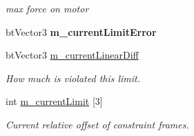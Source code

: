 \begin{DoxyCompactItemize}
\begin{DoxyCompactList}\small\item\em max force on motor \end{DoxyCompactList}\item 
\mbox{\label{classbtTranslationalLimitMotor_a92e72a7a72546204270e5949e5e78530}} 
bt\+Vector3 {\bfseries m\+\_\+current\+Limit\+Error}
\item 
\mbox{\label{classbtTranslationalLimitMotor_a82c7d9119513981d0bafae04e928b6d2}} 
bt\+Vector3 \hyperlink{classbtTranslationalLimitMotor_a82c7d9119513981d0bafae04e928b6d2}{m\+\_\+current\+Linear\+Diff}
\begin{DoxyCompactList}\small\item\em How much is violated this limit. \end{DoxyCompactList}\item 
int \hyperlink{classbtTranslationalLimitMotor_a1448906baeca79c22f3f9217ab5db120}{m\+\_\+current\+Limit} \mbox{[}3\mbox{]}
\begin{DoxyCompactList}\small\item\em Current relative offset of constraint frames. \end{DoxyCompactList}\end{DoxyCompactItemize}
\textbf{ }\par
